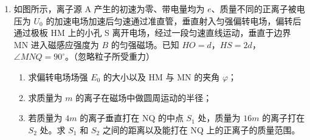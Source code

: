 \documentclass[\gkver]{gaokaozhenti}
\begin{document}
\begin{enumerate}
②由静止释放，外壳竖直上升至下端距桌面高度为 $h_{1}$ 时，与静止的内芯碰撞（见图 b）；

③碰后，内芯与外壳以共同的速度一起上升到外壳下端距桌面最大高度为 $h_{2}$ 处（见图 c）。

设内芯与外壳的撞击力远大于笔所受重力、不计摩擦与空气阻力，重力加速度为 $g$。求：
\begin{enumerate}
	\item
	外壳与内芯碰撞后瞬间的共同速度大小；
	\item
	从外壳离开桌面到碰撞前瞬间，弹簧做的功；
	\item
	从外壳下端离开桌面到上升至 $h_{2}$ 处，笔损失的机械能。
\end{enumerate}


\item
如图所示，离子源 A 产生的初速为零、带电量均为 $e$、质量不同的正离子被电压为 $U_{0}$ 的加速电场加速后匀速通过准直管，垂直射入匀强偏转电场，偏转后通过极板 HM 上的小孔 S 离开电场，经过一段匀速直线运动，垂直于边界 MN 进入磁感应强度为 $B$ 的匀强磁场。已知 $HO=d$，$HS=2d$，$\angle MNQ=90^{\circ}$。（忽略粒子所受重力）
\begin{enumerate}
	\item
	求偏转电场场强 $E_{0}$ 的大小以及 HM 与 MN 的夹角 $\varphi$；
	\item
	求质量为 $m$ 的离子在磁场中做圆周运动的半径；
	\item
	若质量为 $4m$ 的离子垂直打在 NQ 的中点 $S_{1}$ 处，质量为 $16m$ 的离子打在 $S_{2}$ 处。求 $S_{1}$ 和 $S_{2}$ 之间的距离以及能打在 NQ 上的正离子的质量范围。
\end{enumerate}


\end{enumerate}
\end{document}
